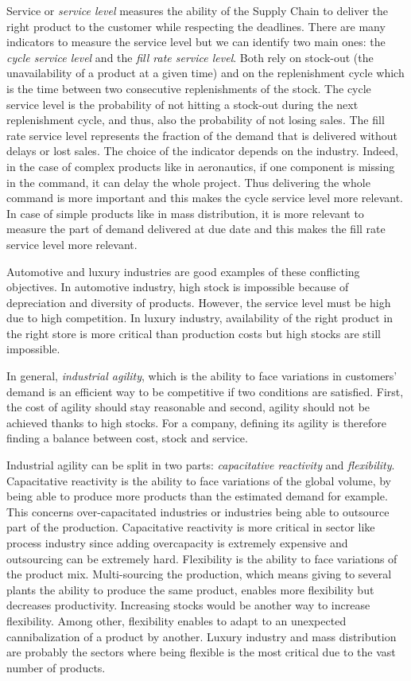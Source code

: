 Service or \emph{service level} measures the ability of the Supply Chain to deliver the right product to the customer while respecting the deadlines.
There are many indicators to measure the service level but we can identify two main ones: the \emph{cycle service level} and the \emph{fill rate service level}.
Both rely on stock-out (\ie the unavailability of a product at a given time) and on the replenishment cycle which is the time between two consecutive replenishments of the stock.
The cycle service level is the probability of not hitting a stock-out during the next replenishment cycle, and thus, also the probability of not losing sales.
The fill rate service level represents the fraction of the demand that is delivered without delays or lost sales.
The choice of the indicator depends on the industry.
Indeed, in the case of complex products like in aeronautics, if one component is missing in the command, it can delay the whole project.
Thus delivering the whole command is more important and this makes the cycle service level more relevant.
In case of simple products like in mass distribution, it is more relevant to measure the part of demand delivered at due date and this makes the fill rate service level more relevant.


\medskip


Automotive and luxury industries are good examples of these conflicting objectives.
In automotive industry, high stock is impossible because of depreciation and diversity of products.
However, the service level must be high due to high competition.
In luxury industry, availability of the right product in the right store is more critical than production costs but high stocks are still impossible.


In general, \emph{industrial agility}, which is the ability to face variations in customers' demand is an efficient way to be competitive if two conditions are satisfied.
First, the cost of agility should stay reasonable and second, agility should not be achieved thanks to high stocks.
For a company, defining its agility is therefore finding a balance between cost, stock and service.


Industrial agility can be split in two parts: \emph{capacitative reactivity} and \emph{flexibility}.
Capacitative reactivity is the ability to face variations of the global volume, by being able to produce more products than the estimated demand for example.
This concerns over-capacitated industries or industries being able to outsource part of the production.
Capacitative reactivity is more critical in sector like process industry since adding overcapacity is extremely expensive and outsourcing can be extremely hard.
Flexibility is the ability to face variations of the product mix.
Multi-sourcing the production, which means giving to several plants the ability to produce the same product, enables more flexibility but decreases productivity.
Increasing stocks would be another way to increase flexibility.
Among other, flexibility enables to adapt to an unexpected cannibalization of a product by another.
Luxury industry and mass distribution are probably the sectors where being flexible is the most critical due to the vast number of products.


